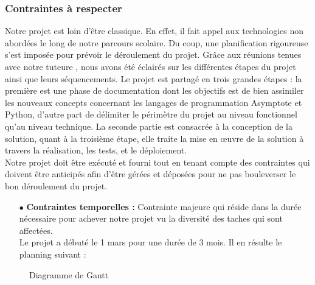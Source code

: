\documentclass[a4paper]{report}
\begin{document}
\subsubsection{Contraintes à respecter}
Notre projet est loin d’être classique. En effet, il fait appel aux technologies non abordées le long de notre parcours scolaire. Du coup, une planification rigoureuse s’est imposée pour prévoir le déroulement du projet. Grâce aux réunions tenues avec notre tuteure , nous avons été éclairés sur les différentes étapes du projet ainsi que leurs séquencements. Le projet est partagé en trois grandes étapes : la première est une phase de documentation dont les objectifs est de bien assimiler les nouveaux concepts concernant les langages de programmation Asymptote et Python, d’autre part de délimiter le périmètre du projet au niveau fonctionnel qu’au niveau technique. La seconde partie est consacrée à la conception de la solution, quant à la troisième étape, elle traite la mise en œuvre de la solution à travers la réalisation, les tests, et le déploiement.\\
Notre projet doit être exécuté et fourni tout en tenant compte des contraintes qui doivent être anticipés afin d'être gérées et déposées pour ne pas bouleverser le bon déroulement du projet.
\begin{itemize}
    \item[$\bullet$] \textbf{Contraintes temporelles : }Contrainte majeure qui réside dans la durée nécessaire pour achever notre projet vu la diversité des taches qui sont affectées.\\
    Le projet a débuté le 1 mars pour une durée de 3 mois. Il en résulte le planning suivant :
\end{itemize}
\newpage
\begin{figure}[!h]
    \centering
    \caption{Diagramme de Gantt}
    \label{fig:Diagramme de Gantt}
\end{figure}
\newpage
\renewcommand{\labelitemi}{\textbullet}
\renewcommand\labelitemii{\textperiodcentered}
\end{document}
